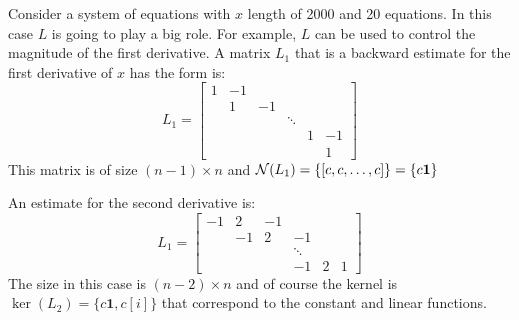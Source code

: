 \begin{examples}
Consider a system of equations with $x$ length of 2000 and 20 equations. In this case $L$ is going to play a big role. For example, $L$ can be used to control the magnitude of the first derivative. A matrix $L_1$ that is a backward estimate for the first derivative of $x$ has the form is:
\begin{equation}
L_1 = \begin{bmatrix} 1 & -1  &   &       && \\
                          &  1  & -1&       && \\
                          &     &   & \ddots&& \\
                          &     &   &       &1&-1\\
                          &     &   &       & & 1
\end{bmatrix} 
\end{equation}
This matrix is of size $(n-1)\times n$ and $\mathcal{N}(L_1) = \{[c,c,\ldots,c]\}= \{c\mathbf{1} \}$

An estimate for the second derivative is:
\begin{equation}
L_1 = \begin{bmatrix} -1 & 2  & -1  &       && \\
                          &  -1  & 2&-1       && \\
                          &     &   & \ddots&& \\
                          &     &   &       -1&2&1
\end{bmatrix} 
\end{equation}
The size in this case is $(n-2)\times n$ and of course the kernel is $\ker(L_2)=\{c\mathbf{1}, c[i] \}$ that correspond to the constant and linear functions.
\end{examples}
                         
